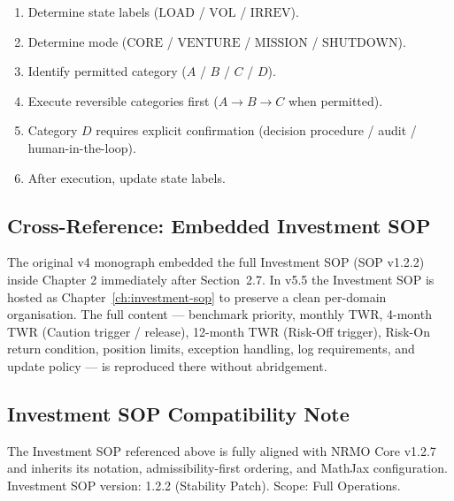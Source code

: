 \begin{enumerate}
\item Determine state labels ($\mathrm{LOAD}$ / $\mathrm{VOL}$ /
$\mathrm{IRREV}$).
\item Determine mode ($\mathrm{CORE}$ / $\mathrm{VENTURE}$ /
$\mathrm{MISSION}$ / $\mathrm{SHUTDOWN}$).
\item Identify permitted category ($A$ / $B$ / $C$ / $D$).
\item Execute reversible categories first ($A \to B \to C$ when
permitted).
\item Category $D$ requires explicit confirmation (decision
procedure / audit / human-in-the-loop).
\item After execution, update state labels.
\end{enumerate}


\subsection{Cross-Reference: Embedded Investment SOP}
\label{sec:action-space-investment-cross-ref}

The original v4 monograph embedded the full Investment SOP
(SOP v1.2.2) inside Chapter 2 immediately after Section~2.7. In
v5.5 the Investment SOP is hosted as Chapter~\ref{ch:investment-sop}
to preserve a clean per-domain organisation. The full content ---
benchmark priority, monthly TWR, 4-month TWR (Caution trigger /
release), 12-month TWR (Risk-Off trigger), Risk-On return condition,
position limits, exception handling, log requirements, and update
policy --- is reproduced there without abridgement.

\subsection{Investment SOP Compatibility Note}
\label{sec:action-space-investment-compat}

The Investment SOP referenced above is fully aligned with NRMO Core
v1.2.7 and inherits its notation, admissibility-first ordering, and
MathJax configuration. Investment SOP version: 1.2.2 (Stability
Patch). Scope: Full Operations.
